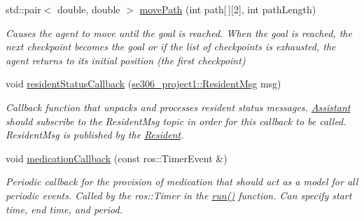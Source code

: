 \begin{DoxyCompactItemize}
\item 
std\-::pair$<$ double, double $>$ \hyperlink{classAssistant_a921c4b094867a4ebc62e404e772d002c}{move\-Path} (int path\mbox{[}$\,$\mbox{]}\mbox{[}2\mbox{]}, int path\-Length)
\begin{DoxyCompactList}\small\item\em Causes the agent to move until the goal is reached. When the goal is reached, the next checkpoint becomes the goal or if the list of checkpoints is exhausted, the agent returns to its initial position (the first checkpoint) \end{DoxyCompactList}\item 
void \hyperlink{classAssistant_ae4f0887ad0748940571fdf9ed1013766}{resident\-Status\-Callback} (\hyperlink{structse306__project1_1_1ResidentMsg__}{se306\-\_\-project1\-::\-Resident\-Msg} msg)
\begin{DoxyCompactList}\small\item\em Callback function that unpacks and processes resident status messages. \hyperlink{classAssistant}{Assistant} should subscribe to the Resident\-Msg topic in order for this callback to be called. Resident\-Msg is published by the \hyperlink{classResident}{Resident}. \end{DoxyCompactList}\item 
void \hyperlink{classAssistant_ae9b3476194ec440164926085a87a81f0}{medication\-Callback} (const ros\-::\-Timer\-Event \&)
\begin{DoxyCompactList}\small\item\em Periodic callback for the provision of medication that should act as a model for all periodic events. Called by the ros\-::\-Timer in the \hyperlink{classAssistant_a50eec4c3693b7b2c7d363ef4848a5815}{run()} function. Can specify start time, end time, and period. \end{DoxyCompactList}\end{DoxyCompactItemize}
